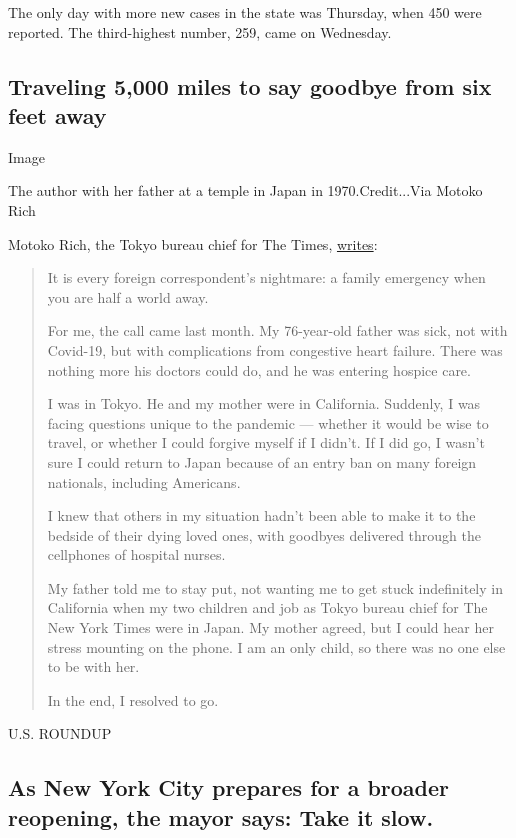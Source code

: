 The only day with more new cases in the state was Thursday, when 450
were reported. The third-highest number, 259, came on Wednesday.

\hypertarget{traveling-5000-miles-to-say-goodbye-from-six-feet-away}{%
\subsection{Traveling 5,000 miles to say goodbye from six feet
away}\label{traveling-5000-miles-to-say-goodbye-from-six-feet-away}}

Image

The author with her father at a temple in Japan in 1970.Credit...Via
Motoko Rich

Motoko Rich, the Tokyo bureau chief for The Times,
\href{https://www.nytimes3xbfgragh.onion/2020/06/19/reader-center/coronavirus-last-goodbyes.html}{writes}:

\begin{quote}
It is every foreign correspondent's nightmare: a family emergency when
you are half a world away.

For me, the call came last month. My 76-year-old father was sick, not
with Covid-19, but with complications from congestive heart failure.
There was nothing more his doctors could do, and he was entering hospice
care.

I was in Tokyo. He and my mother were in California. Suddenly, I was
facing questions unique to the pandemic --- whether it would be wise to
travel, or whether I could forgive myself if I didn't. If I did go, I
wasn't sure I could return to Japan because of an entry ban on many
foreign nationals, including Americans.

I knew that others in my situation hadn't been able to make it to the
bedside of their dying loved ones, with goodbyes delivered through the
cellphones of hospital nurses.

My father told me to stay put, not wanting me to get stuck indefinitely
in California when my two children and job as Tokyo bureau chief for The
New York Times were in Japan. My mother agreed, but I could hear her
stress mounting on the phone. I am an only child, so there was no one
else to be with her.

In the end, I resolved to go.
\end{quote}

U.S. ROUNDUP

\hypertarget{as-new-york-city-prepares-for-a-broader-reopening-the-mayor-says-take-it-slow}{%
\subsection{As New York City prepares for a broader reopening, the mayor
says: Take it
slow.}\label{as-new-york-city-prepares-for-a-broader-reopening-the-mayor-says-take-it-slow}}

